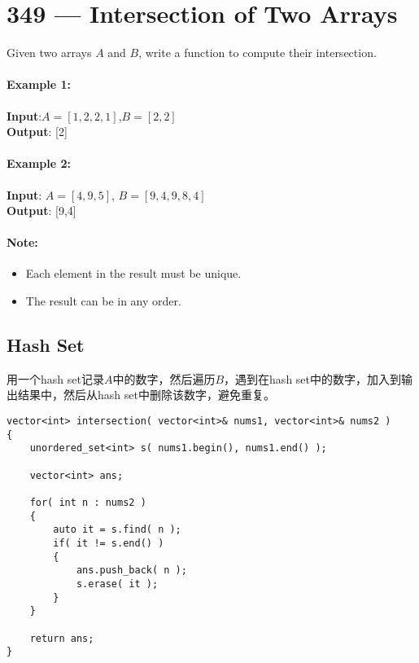 \section{349 --- Intersection of Two Arrays}
Given two arrays $ A $ and $ B $, write a function to compute their intersection.

\paragraph{Example 1:}

\begin{flushleft}
\textbf{Input}:$  A = [1,2,2,1] $,$  B = [2,2] $
\\
\textbf{Output}: [2]
\end{flushleft}


\paragraph{Example 2:}

\begin{flushleft}
\textbf{Input}: $ A = [4,9,5] $, $ B = [9,4,9,8,4] $
\\
\textbf{Output}: [9,4]
\end{flushleft}

\paragraph{Note:}

\begin{itemize}
\item Each element in the result must be unique.
\item The result can be in any order.
\end{itemize}

\subsection{Hash Set}
用一个hash set记录$A$中的数字，然后遍历$B$，遇到在hash set中的数字，加入到输出结果中，然后从hash set中删除该数字，避免重复。

\setcounter{lstlisting}{0}
\begin{lstlisting}[style=customc, caption={Hash Set}]
vector<int> intersection( vector<int>& nums1, vector<int>& nums2 )
{
    unordered_set<int> s( nums1.begin(), nums1.end() );

    vector<int> ans;

    for( int n : nums2 )
    {
        auto it = s.find( n );
        if( it != s.end() )
        {
            ans.push_back( n );
            s.erase( it );
        }
    }

    return ans;
}
\end{lstlisting}